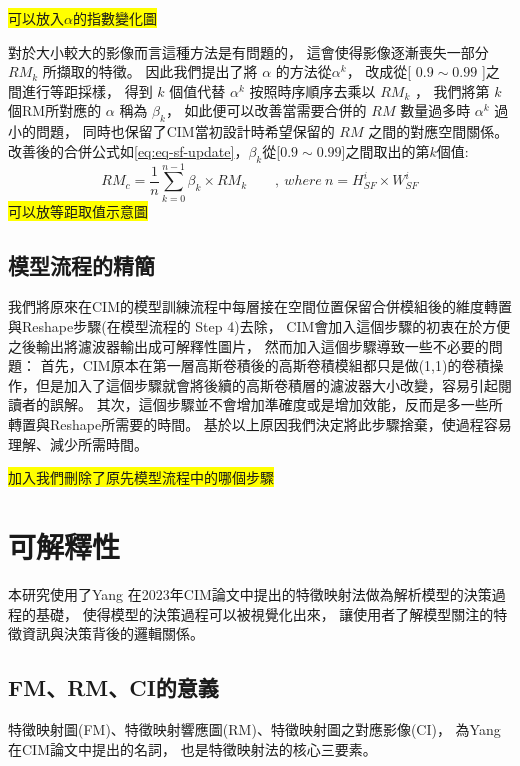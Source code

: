 \documentclass[class=NCU_thesis, crop=false]{standalone}
\begin{document}
	\colorbox {yellow}{可以放入$\alpha$的指數變化圖}

	對於大小較大的影像而言這種方法是有問題的，
	這會使得影像逐漸喪失一部分$ RM_{k} $ 所擷取的特徵。
	因此我們提出了將 $\alpha$ 的方法從$\alpha^{k}$，
	改成從[ $0.9 \sim 0.99$ ]之間進行等距採樣，
	得到 $k$ 個值代替 $\alpha^{k}$ 按照時序順序去乘以 $RM_{k}$ ，
	我們將第 $k$ 個RM所對應的 $\alpha$ 稱為 $\beta_{k}$，
	如此便可以改善當需要合併的 $RM$ 數量過多時 $\alpha^{k}$ 過小的問題，
	同時也保留了CIM當初設計時希望保留的 $RM$ 之間的對應空間關係。\\
	改善後的合併公式如\cref{eq:eq-sf-update}，$\beta_{k}$從[$0.9 \sim 0.99$]之間取出的第$k$個值:\\
		\begin{equation}
		    \label{eq:eq-sf-update}
		    RM_{c}=\frac{1}{n} \sum_{k = 0}^{n-1} \beta_{k} \times RM_{k}  \qquad ,\ where\ n = \textit{H}^{i}_{SF} \times \textit{W}^{i}_{SF}
		\end{equation}
	\colorbox {yellow}{可以放等距取值示意圖\cite{YangCNNInterpretable}}

	\subsection{模型流程的精簡}

	我們將原來在CIM的模型訓練流程中每層接在空間位置保留合併模組後的維度轉置與Reshape步驟(在\cite{YangCNNInterpretable}模型流程的 Step 4)去除，
	CIM會加入這個步驟的初衷在於方便之後輸出將濾波器輸出成可解釋性圖片，
	然而加入這個步驟導致一些不必要的問題：
	首先，CIM原本在第一層高斯卷積後的高斯卷積模組都只是做(1,1)的卷積操作，但是加入了這個步驟就會將後續的高斯卷積層的濾波器大小改變，容易引起閱讀者的誤解。
	其次，這個步驟並不會增加準確度或是增加效能，反而是多一些所轉置與Reshape所需要的時間。
	基於以上原因我們決定將此步驟捨棄，使過程容易理解、減少所需時間。

	\colorbox {yellow}{加入我們刪除了原先模型流程中的哪個步驟}


\pagebreak
\section{可解釋性} 
本研究使用了Yang 在2023年CIM論文中提出的特徵映射法做為解析模型的決策過程的基礎，
使得模型的決策過程可以被視覺化出來，
讓使用者了解模型關注的特徵資訊與決策背後的邏輯關係。
	
	\subsection{FM、RM、CI的意義}
	\label{section:InterablePicture}
	特徵映射圖(FM)、特徵映射響應圖(RM)、特徵映射圖之對應影像(CI)，
	為Yang在CIM論文中提出的名詞，
	也是特徵映射法的核心三要素。
\end{document}
